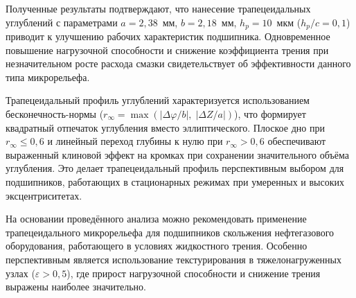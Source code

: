 Полученные результаты подтверждают, что нанесение трапецеидальных углублений с параметрами $a = 2{,}38$~мм, $b = 2{,}18$~мм, $h_p = 10$~мкм ($h_p/c = 0{,}1$) приводит к улучшению рабочих характеристик подшипника. Одновременное повышение нагрузочной способности и снижение коэффициента трения при незначительном росте расхода смазки свидетельствует об эффективности данного типа микрорельефа.

Трапецеидальный профиль углублений характеризуется использованием бесконечность-нормы ($r_\infty = \max(|\Delta\varphi/b|,\; |\Delta Z/a|)$), что формирует квадратный отпечаток углубления вместо эллиптического. Плоское дно при $r_\infty \leq 0{,}6$ и линейный переход глубины к нулю при $r_\infty > 0{,}6$ обеспечивают выраженный клиновой эффект на кромках при сохранении значительного объёма углубления. Это делает трапецеидальный профиль перспективным выбором для подшипников, работающих в стационарных режимах при умеренных и высоких эксцентриситетах.

На основании проведённого анализа можно рекомендовать применение трапецеидального микрорельефа для подшипников скольжения нефтегазового оборудования, работающего в условиях жидкостного трения. Особенно перспективным является использование текстурирования в тяжелонагруженных узлах ($\varepsilon > 0{,}5$), где прирост нагрузочной способности и снижение трения выражены наиболее значительно.
